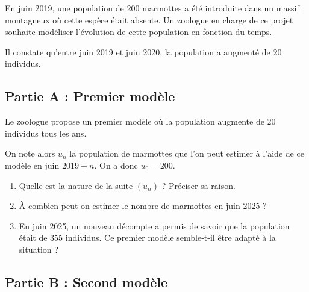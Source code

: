 En juin 2019, une population de 200 marmottes a été introduite dans un massif montagneux où cette espèce était absente. Un zoologue en charge de ce projet souhaite modéliser l'évolution de cette population en fonction du temps.
	
	Il constate qu'entre juin 2019 et juin 2020, la population a augmenté de 20 individus.
	
	\subsection*{Partie A : Premier modèle}
	
	Le zoologue propose un premier modèle où la population augmente de 20 individus tous les ans.
	
	On note alors $u_{n}$ la population de marmottes que l'on peut estimer à l'aide de ce modèle en juin $2019+n$. On a donc $u_{0}=200$.
	
	\begin{enumerate}
		\item Quelle est la nature de la suite $\left(u_{n}\right)$ ? Préciser sa raison.
		
		\item À combien peut-on estimer le nombre de marmottes en juin 2025 ?
		
		\item En juin 2025, un nouveau décompte a permis de savoir que la population était de 355 individus. Ce premier modèle semble-t-il être adapté à la situation ?
	\end{enumerate}
	
	\subsection*{Partie B : Second modèle}
	
